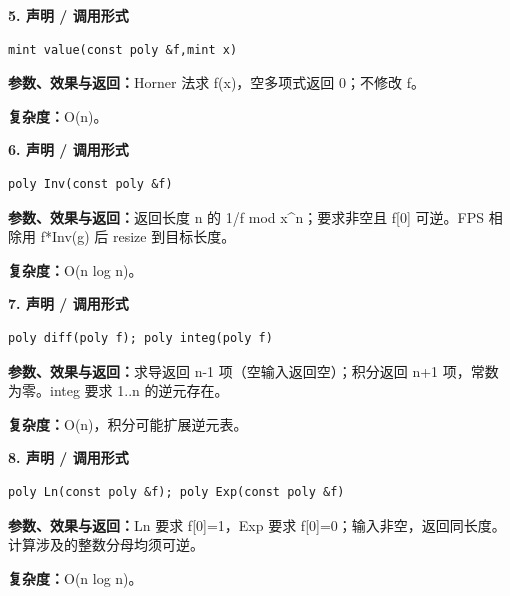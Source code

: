 \documentclass[UTF8,a4paper,10pt]{ctexart}
\begin{document}
\noindent\begin{minipage}{\textwidth}
\textbf{5. 声明 / 调用形式}
\begin{lstlisting}
mint value(const poly &f,mint x)
\end{lstlisting}
\textbf{参数、效果与返回：}Horner 法求 f(x)，空多项式返回 0；不修改 f。

\textbf{复杂度：}O(n)。

\end{minipage}\par\vspace{0.4em}
\noindent\begin{minipage}{\textwidth}
\textbf{6. 声明 / 调用形式}
\begin{lstlisting}
poly Inv(const poly &f)
\end{lstlisting}
\textbf{参数、效果与返回：}返回长度 n 的 1/f mod x\textasciicircum{}n；要求非空且 f[0] 可逆。FPS 相除用 f*Inv(g) 后 resize 到目标长度。

\textbf{复杂度：}O(n log n)。

\end{minipage}\par\vspace{0.4em}
\noindent\begin{minipage}{\textwidth}
\textbf{7. 声明 / 调用形式}
\begin{lstlisting}
poly diff(poly f); poly integ(poly f)
\end{lstlisting}
\textbf{参数、效果与返回：}求导返回 n-1 项（空输入返回空）；积分返回 n+1 项，常数为零。integ 要求 1..n 的逆元存在。

\textbf{复杂度：}O(n)，积分可能扩展逆元表。

\end{minipage}\par\vspace{0.4em}
\noindent\begin{minipage}{\textwidth}
\textbf{8. 声明 / 调用形式}
\begin{lstlisting}
poly Ln(const poly &f); poly Exp(const poly &f)
\end{lstlisting}
\textbf{参数、效果与返回：}Ln 要求 f[0]=1，Exp 要求 f[0]=0；输入非空，返回同长度。计算涉及的整数分母均须可逆。

\textbf{复杂度：}O(n log n)。

\end{minipage}\par\vspace{0.4em}
\end{document}
